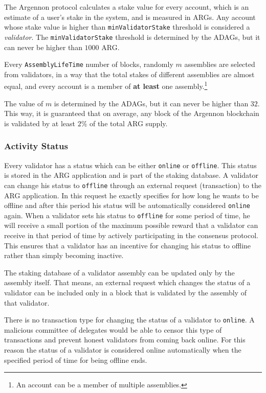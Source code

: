 The Argennon protocol calculates a stake value for every account, which is an estimate of a user's stake in the
system, and is measured in ARGs. Any account whose stake value is higher than
\texttt{minValidatorStake} threshold is considered a \emph{validator}.
The \texttt{minValidatorStake}
threshold is determined by the ADAGs, but it can never be higher than $1000$ ARG\@.

Every \texttt{AssemblyLifeTime} number of blocks, randomly $m$ assemblies are selected from
validators, in a way that the total stakes of different assemblies are almost equal, and every
account is a member of \textbf{at least} one assembly.\footnote{An account can be a member of multiple assemblies.}

The value of $m$ is determined by the ADAGs, but it can never be higher than $32$. This way, it is guaranteed
that on average, any block of the Argennon blockchain is validated by at least $2\%$ of the total ARG supply.

\subsubsection{Activity Status}

Every validator has a status which can be either \texttt{online} or \texttt{offline}.
This status is stored in the ARG application and is part of the staking database. A validator can change
his status to \texttt{offline} through an external request (transaction) to the ARG application. In this request he
exactly specifies for how long he wants to be offline and after this period his status will be automatically considered
\texttt{online} again. When a validator sets his status to \texttt{offline} for some period of time, he
will receive a small portion of the maximum possible reward that a validator can receive in that period of time by
actively participating in the consensus protocol. This ensures that a validator has an incentive for changing his
status to offline rather than simply becoming inactive.

The staking database of a validator assembly can be updated only by the assembly itself. That means, an external
request which changes the status of a validator can be included only in a block that is validated by the assembly of
that validator.

There is no transaction type for changing the status of a validator to \texttt{online}. A malicious committee
of delegates would be able to censor this type of transactions and prevent honest validators from coming back online.
For this reason the status of a validator is considered online automatically when the specified period of time for
being offline ends.

